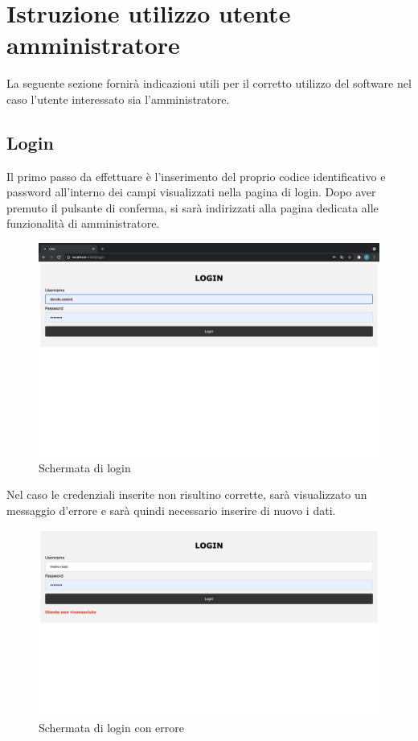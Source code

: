 \section{Istruzione utilizzo utente amministratore}

La seguente sezione fornirà indicazioni utili per il corretto utilizzo del software nel caso l'utente interessato sia l'amministratore.

\subsection{Login}
Il primo passo da effettuare è l'inserimento del proprio codice identificativo e password all'interno dei campi visualizzati nella pagina di login. Dopo aver premuto il pulsante di conferma, si sarà indirizzati alla pagina dedicata alle funzionalità di amministratore. 
\begin{figure}[H]
    \centering
    \includegraphics[scale=0.12]{res/images/login.png}
    \caption{Schermata di login}
\end{figure}
Nel caso le credenziali inserite non risultino corrette, sarà visualizzato un messaggio d'errore e sarà quindi necessario inserire di nuovo i dati.
\begin{figure}[H]
    \centering
    \includegraphics[scale=0.2]{res/images/login_errato.png}
    \caption{Schermata di login con errore}
\end{figure}

